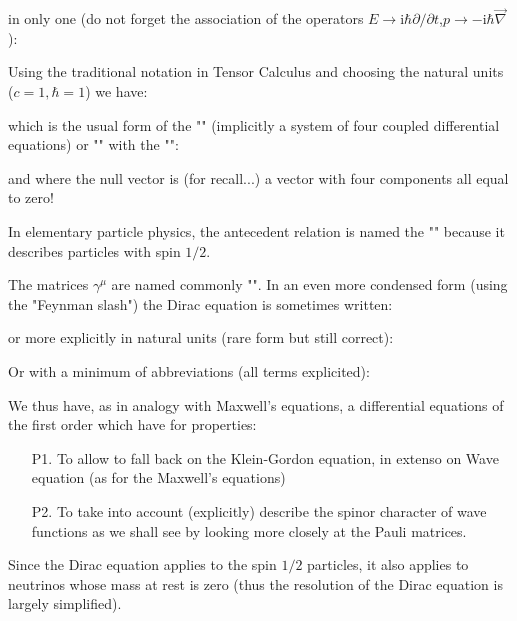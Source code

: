 	in only one (do not forget the association of the operators $E\rightarrow \mathrm{i}\hbar\partial/\partial t$,$p\rightarrow -\mathrm{i}\hbar\vec{\nabla}$):
	
	Using the traditional notation in Tensor Calculus and choosing the natural units ($c=1,\hbar=1$) we have:
	
	which is the usual form of the "\label{dirac equation}" (implicitly a system of four coupled differential equations) or "" with the "":
	
	and where the null vector is (for recall...) a vector with four components all equal to zero!
	\begin{tcolorbox}[title=Remark,colframe=black,arc=10pt]
	In elementary particle physics, the antecedent relation is named the "" because it describes particles with spin $1/2$.
	\end{tcolorbox}
	The matrices $\gamma^\mu$ are named commonly "". In an even more condensed form (using the "Feynman slash") the Dirac equation is sometimes written:
	
	or more explicitly in natural units (rare form but still correct):
	
	Or with a minimum of abbreviations (all terms explicited):
	
	
	We thus have, as in analogy with Maxwell's equations, a differential equations of the first order which have for properties:
	\begin{enumerate}
		\item[P1.] To allow to fall back on the Klein-Gordon equation, in extenso on Wave equation (as for the Maxwell's equations)

		\item[P2.] To take into account (explicitly) describe the spinor character of wave functions as we shall see by looking more closely at the Pauli matrices.
	\end{enumerate}
	\begin{tcolorbox}[title=Remark,colframe=black,arc=10pt]
	Since the Dirac equation applies to the spin $1/2$ particles, it also applies to neutrinos whose mass at rest is zero (thus the resolution of the Dirac equation is largely simplified).
	\end{tcolorbox}
	
